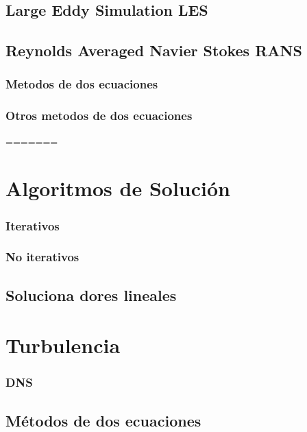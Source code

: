 	\subsection{Large Eddy Simulation LES}
	\subsection{Reynolds Averaged Navier Stokes RANS}
		\subsubsection{Metodos de dos ecuaciones}
		\subsubsection{Otros metodos de dos ecuaciones}
	
	
=======
\section{Algoritmos de Solución} %
	\subsubsection{Iterativos}
	\subsubsection{No iterativos}
	\subsection{Soluciona dores lineales}

\section{Turbulencia}
	\subsubsection{DNS}
	\subsection{Métodos de dos ecuaciones} %
	
